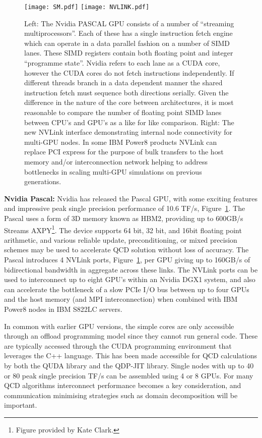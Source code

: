 \documentclass{PoS}
\begin{document}
\begin{figure}[hbt]
\texttt{[image: SM.pdf]}
\texttt{[image: NVLINK.pdf]}
\caption{\label{fig:pascal}
Left: The Nvidia PASCAL GPU consists of a number of ``streaming multiprocessors''. Each of these has a
single instruction fetch engine which can operate in a data parallel fashion on a number of SIMD lanes.
These SIMD registers contain both floating point and integer ``programme state''. Nvidia refers to 
each lane as a CUDA core, however the CUDA cores do not fetch instructions independently. If different
threads branch in a data dependent manner the shared instruction fetch must sequence both directions serially.
Given the difference in the nature of the core between architectures, it is most reasonable to compare
the number of floating point SIMD lanes between CPU's and GPU's as a like for like comparison.
Right: The new NVLink interface demonstrating internal node connectivity for multi-GPU nodes. In some IBM Power8 products NVLink can replace
PCI express for the purpose of bulk transfers to the host memory and/or interconnection network helping to address
bottlenecks in scaling multi-GPU simulations on previous generations.
}
\end{figure}

{\bf Nvidia Pascal:}
Nvidia has released the Pascal GPU, with some exciting features and impressive peak single precision performance of 10.6 TF/s,
Figure~\ref{fig:pascal}. The Pascal uses a form of 3D memory known as HBM2, providing up to 600GB/s Streams AXPY\footnote{Figure
provided by Kate Clark.}. The device supports 64 bit, 32 bit, and 16bit floating point arithmetic, and 
various reliable update, preconditioning, or mixed precision schemes may be used to accelerate
QCD solution without loss of accuracy. 
The Pascal introduces 4 NVLink ports, Figure~\ref{fig:pascal}, per GPU giving up to 160GB/s of bidirectional bandwidth in aggregate
across these links. The NVLink ports can be used to interconnect up to eight GPU's within an Nvidia DGX1 system, and also
can accelerate the bottleneck of a slow PCIe I/O bus between up to four GPUs and the host memory (and MPI interconnection)
when combined with IBM Power8 nodes in IBM S822LC servers. 

In common with earlier GPU versions, the simple cores are only accessible through an offload
programming model since they cannot run general code. These are typically accessed through the
CUDA programming environment that leverages the C++ language. This has been made accessible
for QCD calculations by both the QUDA library \cite{quda} and the QDP-JIT library\cite{qdp-jit}.
Single nodes with up to 40 or 80 peak single precision TF/s can be assembled using 4 or 8 GPUs. 
For many QCD algorithms interconnect performance becomes a key consideration, and communication minimising strategies
such as domain decomposition will be important.
\end{document}
